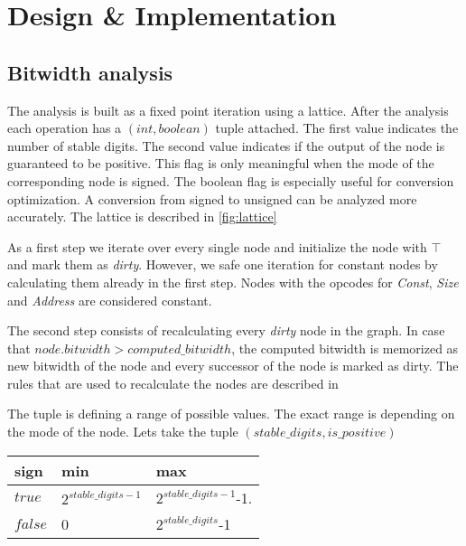 \chapter{Design \& Implementation}\label{sec:impl}

\section{Bitwidth analysis}
The analysis is built as a fixed point iteration using a lattice. After the analysis each operation has a $(int,boolean)$ tuple attached. 
The first value indicates the number of stable digits. 
The second value indicates if the output of the node is guaranteed to be positive. 
This flag is only meaningful when the mode of the corresponding node is signed. 
The boolean flag is especially useful for conversion optimization. A conversion from signed to unsigned can be analyzed more accurately. 
The lattice is described in \ref{fig:lattice}


As a first step we iterate over every single node and initialize the node with $\top$ and mark them as \textit{dirty}. However, we safe one iteration for constant nodes by calculating them already in the first step. Nodes with the opcodes for \textit{Const}, \textit{Size} and \textit{Address} are considered constant.

The second step consists of recalculating every \textit{dirty} node in the graph. In case that $node.bitwidth > computed\_bitwidth$, the computed bitwidth is memorized as new bitwidth of the node and every successor of the node is marked as dirty. The rules that are used to recalculate the nodes are described in %

The tuple is defining a range of possible values. The exact range is depending on the mode of the node. Lets take the tuple $(stable\_digits,is\_positive)$
\begin{center}
	\begin{tabular}{| l | l | l |}
		\hline
		sign & min & max \\ \hline
		$true$ & $2^{stable\_digits-1}$ & $2^{stable\_digits-1}$-1. \\ \hline
		$false$ & 0 & $2^{stable\_digits}$-1 \\
		\hline
	\end{tabular}
\end{center}

